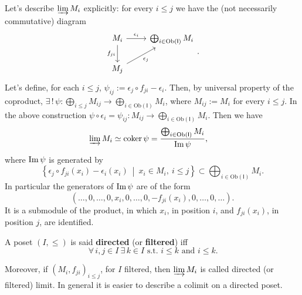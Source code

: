 \begin{ex}
	Let's describe $\varinjlim M_i$ explicitly: for every $i \leq j$ we have the (not necessarily commutative) diagram
	\begin{equation}
	\begin{tikzcd}
		M_i \arrow[r, "\epsilon_i", rightarrow] \arrow[d, "f_{ji}"', rightarrow] &
		\bigoplus_{i \in \mathrm{Ob} \left(\mathsf{I}\right)} M_i \\
		M_j \arrow[ru, "\epsilon_j"', rightarrow] & 
	\end{tikzcd} 
	.\end{equation}
	Let's define, for each $i \leq j$, $\psi_{ij} := \epsilon_j \circ f_{ji} - \epsilon_i$.
	Then, by universal property of the coproduct,
	$\exists\, !\, \psi: \bigoplus_{i \leq j} M_{ij} \to \bigoplus_{i \in \mathrm{Ob} \left(\mathsf{I}\right)} M_{i}$,
	where $M_{ij} := M_i$ for every $i \leq j$.
	In the above construction $\psi \circ \epsilon_i = \psi_{ij}: M_{ij} \to \bigoplus_{i \in \mathrm{Ob} \left(\mathsf{I}\right)} M_i$.
	Then we have
	\begin{align}
		\varinjlim M_i &\simeq \operatorname{coker} \psi =
		\frac{\bigoplus_{i \in \mathrm{Ob} \left(\mathsf{I}\right)} M_i}{\operatorname{Im} \psi}
	,\end{align}
	where $\operatorname{Im} \psi$ is generated by
	\begin{equation}
		\left\{ \epsilon_j \circ f_{ji}(x_i) - \epsilon_i(x_i) \ \middle|\ 
		x_i \in M_i,\ i \leq j \right\} \subset
		\bigoplus_{i \in \mathrm{Ob} \left(\mathsf{I}\right)} M_i
	.\end{equation} 
	In particular the generators of $\operatorname{Im} \psi$ are of the form
	\begin{equation}
		\left( \ldots, 0, \ldots, 
		0, x_i, 0, \ldots, 0, - f_{ji}(x_i),
		0, \ldots, 0, \ldots \right)
	.\end{equation} 	
	It is a submodule of the product, in which $x_i$, in position $i$,
	and $f_{ji}(x_i)$, in position $j$, are identified.
\end{ex}

\begin{defn}
	A poset $\left(I, \leq \right)$ is said \textbf{directed} (or \textbf{filtered}) iff
	\begin{equation}
	\,\forall\,  i, j \in I \ \exists\, k \in I \text{ s.t. } i \leq k \text{ and } i \leq k
	.\end{equation} 
\end{defn}
Moreover, if $\left(M_i, f_{ji}\right)_{i \leq j}$, for $I$ filtered, then $\varinjlim M_i$ is called
directed (or filtered) limit.
In general it is easier to describe a colimit on a directed poset.

